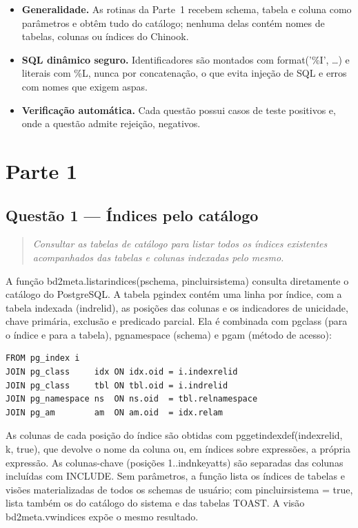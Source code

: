 \documentclass[11pt,a4paper]{article}
\newcommand{\cod}[1]{{\ttfamily\renewcommand{\_}{\textunderscore\allowbreak}#1}}
\newenvironment{enunciado}{\begin{quote}\small\itshape}{\end{quote}}
\begin{document}
\begin{itemize}
  \item \textbf{Generalidade.} As rotinas da Parte~1 recebem schema, tabela e coluna como parâmetros e obtêm tudo
        do catálogo; nenhuma delas contém nomes de tabelas, colunas ou índices do Chinook.
  \item \textbf{SQL dinâmico seguro.} Identificadores são montados com \cod{format('\%I', \dots)} e literais com
        \cod{\%L}, nunca por concatenação, o que evita injeção de SQL e erros com nomes que exigem aspas.
  \item \textbf{Verificação automática.} Cada questão possui casos de teste positivos e, onde a questão admite
        rejeição, negativos.
\end{itemize}

\section{Parte 1}

\subsection{Questão 1 --- Índices pelo catálogo}

\begin{enunciado}
Consultar as tabelas de catálogo para listar todos os índices existentes acompanhados das tabelas e colunas
indexadas pelo mesmo.
\end{enunciado}

A função \cod{bd2\_meta.listar\_indices(p\_schema, p\_incluir\_sistema)} consulta diretamente o catálogo do
PostgreSQL. A tabela \cod{pg\_index} contém uma linha por índice, com a tabela indexada (\cod{indrelid}), as
posições das colunas e os indicadores de unicidade, chave primária, exclusão e predicado parcial. Ela é combinada
com \cod{pg\_class} (para o índice e para a tabela), \cod{pg\_namespace} (schema) e \cod{pg\_am} (método de
acesso):

\begin{lstlisting}
FROM pg_index i
JOIN pg_class     idx ON idx.oid = i.indexrelid
JOIN pg_class     tbl ON tbl.oid = i.indrelid
JOIN pg_namespace ns  ON ns.oid  = tbl.relnamespace
JOIN pg_am        am  ON am.oid  = idx.relam
\end{lstlisting}

As colunas de cada posição do índice são obtidas com \cod{pg\_get\_indexdef(indexrelid, k, true)}, que devolve o
nome da coluna ou, em índices sobre expressões, a própria expressão. As colunas-chave (posições
\cod{1..indnkeyatts}) são separadas das colunas incluídas com \cod{INCLUDE}. Sem parâmetros, a função lista os
índices de tabelas e visões materializadas de todos os schemas de usuário; com \cod{p\_incluir\_sistema = true},
lista também os do catálogo do sistema e das tabelas TOAST. A visão \cod{bd2\_meta.vw\_indices} expõe o mesmo resultado.
\end{document}
